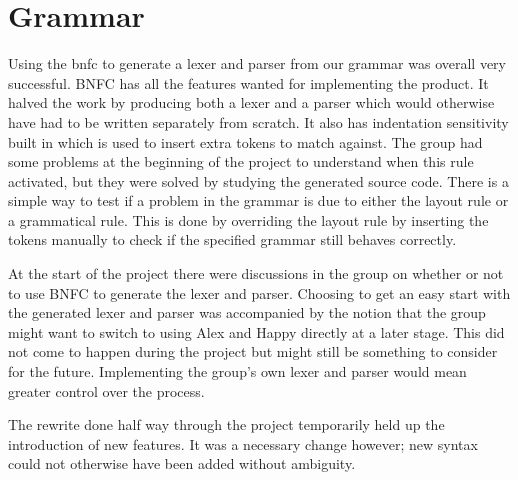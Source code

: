 \section{Grammar}

Using the \gls{bnfc} to generate a lexer and parser from our grammar was overall very successful. BNFC has all the features wanted for implementing the product. It halved the work by producing both a lexer and a parser which would otherwise have had to be written separately from scratch. It also has indentation sensitivity built in which is used to insert extra tokens to match against. The group had some problems at the beginning of the project to understand when this rule activated, but they were solved by studying the generated source code. There is a simple way to test if a problem in the grammar is due to either the layout rule or a grammatical rule. This is done by overriding the layout rule by inserting the tokens manually to check if the specified grammar still behaves correctly.

At the start of the project there were discussions in the group on whether or not to use BNFC to generate the lexer and parser. Choosing to get an easy start with the generated lexer and parser was accompanied by the notion that the group might want to switch to using Alex \cite{alex} and Happy \cite{happy} directly at a later stage. This did not come to happen during the project but might still be something to consider for the future. Implementing the group's own lexer and parser would mean greater control over the process.

The rewrite done half way through the project temporarily held up the introduction of new features. It was a necessary change however; new syntax could not otherwise have been added without ambiguity.

